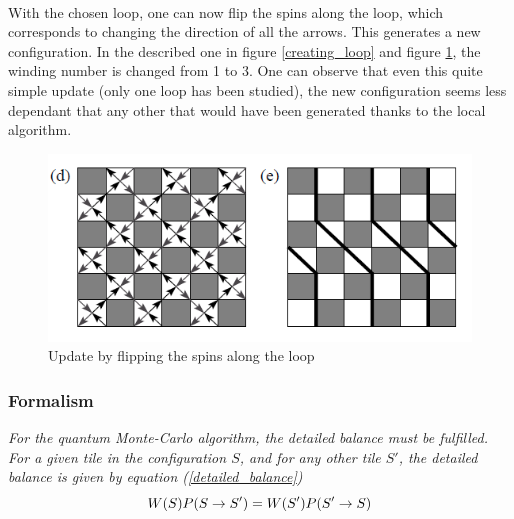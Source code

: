 \documentclass[a4paper,12pt,twoside]{article}
\begin{document}
	\paragraph{}
	With the chosen loop, one can now flip the spins along the loop, which corresponds to changing the direction of all the arrows. This generates a new configuration. In the described one in figure \ref{creating_loop} and figure \ref{loop_update}, the winding number is changed from 1 to 3. One can observe that even this quite simple update (only one loop has been studied), the new configuration seems less dependant that any other that would have been generated thanks to the local algorithm. 
	\begin{figure}[!h]
		\centering
		\includegraphics[]{loop_update.png}
		\caption{Update by flipping the spins along the loop}
		\label{loop_update}
	\end{figure}

	\subsubsection{Formalism}
	\emph{For the quantum Monte-Carlo algorithm, the detailed balance must be fulfilled. For a given tile in the configuration $S$, and for any other tile $S'$, the detailed balance is given by equation (\ref{detailed_balance})}
	\begin{equation}
		\centering
		W(S)P(S\rightarrow S') = W(S')P(S'\rightarrow S)
		\label{detailed_balance}
	\end{equation}
	
\end{document}
